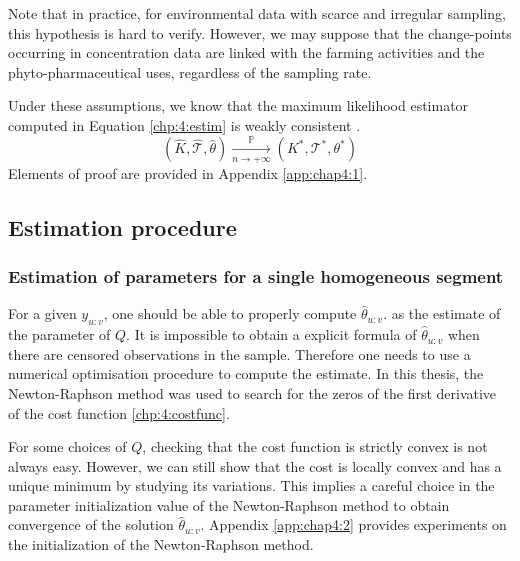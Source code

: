 Note that in practice, for environmental data with scarce and irregular sampling, this hypothesis is hard to verify.
However, we may suppose that the change-points occurring in concentration data are linked with the farming activities and the phyto-pharmaceutical uses, regardless of the sampling rate. 

Under these assumptions, we know that the maximum likelihood estimator computed in Equation \eqref{chp:4:estim} is weakly consistent \citep{Lavielle1997}. \begin{equation}
(\widehat{K},\widehat{\mathcal{T}},\widehat{\theta}) \xrightarrow[n\to+\infty]{\mathbb{P}} (K^*,\mathcal{T}^*,\theta^*)
\end{equation}
Elements of proof are provided in Appendix \ref{app:chap4:1}. 


\subsection{Estimation procedure}

\subsubsection{Estimation of parameters for a single homogeneous segment}

For a given $y_{u:v}$, one should be able to properly compute $\widehat{\theta}_{u:v}$. as the estimate of the parameter of $Q$. It is impossible to obtain a explicit formula of $\widehat{\theta}_{u:v}$ when there are censored observations in the sample. Therefore one needs to use a numerical optimisation procedure to compute the estimate. In this thesis, the Newton-Raphson method was used to search for the zeros of the first derivative of the cost function \eqref{chp:4:costfunc}.  

For some choices of $Q$, checking that the cost function is strictly convex is not always easy. However, we can still show that the cost is locally convex and has a unique minimum by studying its variations. This implies a careful choice in the parameter initialization value of the Newton-Raphson method to obtain convergence of the solution $\widehat{\theta}_{u:v}$. Appendix \ref{app:chap4:2} provides experiments on the initialization of the Newton-Raphson method. 

